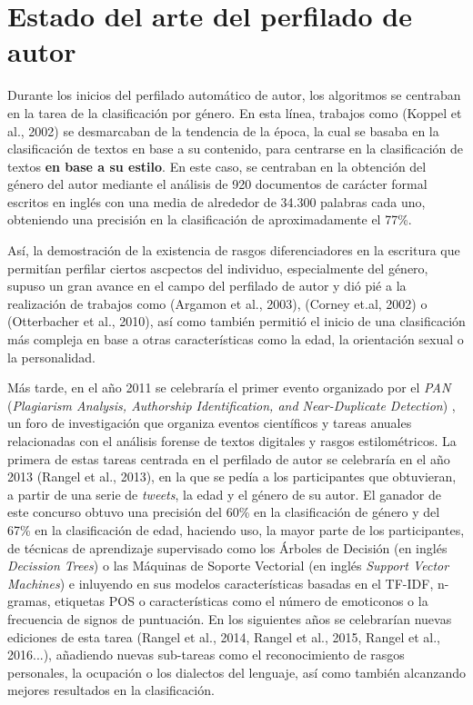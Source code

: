 \chapter{Estado del arte del perfilado de autor}
\label{chap:estadoarte}

Durante los inicios del perfilado automático de autor, los algoritmos se centraban en la tarea de la clasificación por género.
En esta línea, trabajos como (Koppel et al., 2002)\cite{koppel2002automatically} se desmarcaban de la tendencia de la época,
la cual se basaba en la clasificación de textos en base a su contenido, para centrarse en la clasificación de textos \textbf{en base a su estilo}. En este caso, se centraban en la obtención del género del autor mediante el análisis
de 920 documentos de carácter formal escritos en inglés con una media de alrededor de 34.300 palabras cada uno, obteniendo una precisión en la clasificación de
aproximadamente el 77\%.

\bigskip
Así, la demostración de la existencia de rasgos diferenciadores en la escritura que permitían perfilar ciertos ascpectos del individuo, especialmente del género, 
supuso un gran avance en el campo del perfilado de autor
y dió pié a la realización de trabajos como (Argamon et al., 2003)\cite{argamon2003gender}, (Corney et.al, 2002)\cite{corney2002gender} o (Otterbacher et al., 2010)\cite{otterbacher2010inferring}, 
así como también permitió el inicio de una clasificación más compleja en base a otras características como la edad, la orientación sexual o la personalidad.

\bigskip
Más tarde, en el año 2011 se celebraría el primer evento organizado por el \textit{PAN} (\textit{Plagiarism Analysis, Authorship Identification, and Near-Duplicate Detection}) \cite{pan},
un foro de investigación que organiza eventos científicos y tareas anuales relacionadas con el análisis forense de textos digitales
y rasgos estilométricos. La primera de estas tareas centrada en el perfilado de autor se celebraría en el año 2013 (Rangel et al., 2013)\cite{rangel2013overview},
en la que se pedía a los participantes que obtuvieran, a partir de una serie de \textit{tweets}, la edad y el género de su autor. El ganador de este concurso obtuvo una
precisión del 60\% en la clasificación de género y del 67\% en la clasificación de edad, haciendo uso, la mayor parte de los participantes, de técnicas de aprendizaje
supervisado como los Árboles de Decisión (en inglés \textit{Decission Trees}) o las Máquinas de Soporte Vectorial (en inglés \textit{Support Vector Machines}) e inluyendo
en sus modelos características basadas en el TF-IDF, n-gramas, etiquetas POS o características como el número de emoticonos o la frecuencia de signos de puntuación.
En los siguientes años se celebrarían nuevas ediciones de esta tarea (Rangel et al., 2014\cite{rangel2014overview}, Rangel et al., 2015\cite{rangel2015overview},
Rangel et al., 2016\cite{rangel2016overview}...), añadiendo nuevas sub-tareas como el reconocimiento de rasgos personales, la ocupación o los dialectos del lenguaje,
así como también alcanzando mejores resultados en la clasificación.

